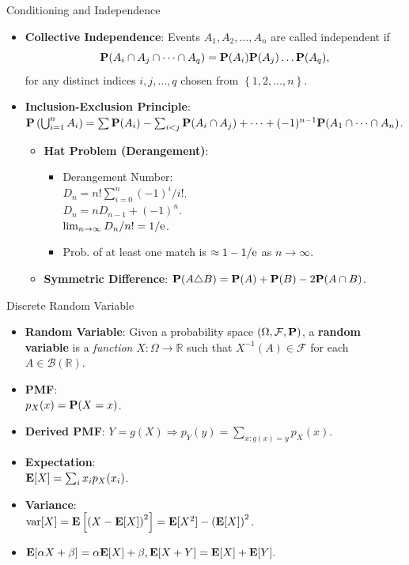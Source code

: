 \documentclass[landscape,a4paper]{article}
\begin{document}
\begin{cheatsheetcolumns}
\begin{card}{Conditioning and Independence}
\begin{itemize}
			\item \textbf{Collective Independence}: Events $A_1,A_2,\dots, A_n$ are called independent if
			\[
			\mathbf{P}(A_i\cap A_j\cap \dots\cap A_q)=\mathbf{P}(A_i)\mathbf{P}(A_j)\dots\mathbf{P}(A_q),
			\]
			for any distinct indices $i,j,\dots,q$ chosen from $\left\{1,2,\dots,n\right\}$.
			\item \textbf{Inclusion-Exclusion Principle}:
			$\mathbf{P}\left(\bigcup_{i=1}^n A_i\right) = \sum \mathbf{P}(A_i) - \sum_{i<j} \mathbf{P}(A_i \cap A_j) + \dots + (-1)^{n-1} \mathbf{P}(A_1 \cap \dots \cap A_n)$.
			\begin{itemize}
				\item \textbf{Hat Problem (Derangement)}: 
				\begin{itemize}
					\item Derangement Number:\\ $D_n=n!\sum_{i=0}^n(-1)^i/i!$.\\
					$D_n=nD_{n-1}+(-1)^n$.\\
					$\lim_{n\to\infty} D_n/n!=1/\mathrm{e}$.
					\item Prob. of at least one match is $\approx 1 - 1/\mathrm{e}$ as $n\to\infty$.
				\end{itemize}
				\item \textbf{Symmetric Difference}: $\mathbf{P}(A \triangle B) = \mathbf{P}(A) + \mathbf{P}(B) - 2\mathbf{P}(A \cap B)$.
			\end{itemize}
			\end{itemize}
		\end{card}
		\begin{card}{Discrete Random Variable}
			\begin{itemize}
				\item \textbf{Random Variable}: Given a probability space $(\Omega,\mathcal F,\mathbf{P})$, a \textbf{random variable} is a \textit{function} $X\colon \Omega\to \mathbb R$ such that $X^{-1}(A)\in\mathcal F$ for each $A\in\mathcal B(\mathbb R)$.
				\item \textbf{PMF}:\\ $p_X(x)=\mathbf{P}(X=x)$.
				\item \textbf{Derived PMF}: $Y=g(X)\Rightarrow p_Y(y)=\sum_{x:g(x)=y}p_X(x)$.
				\item \textbf{Expectation}:\\ $\mathbf{E}[X]=\sum_ix_ip_X(x_i)$.
				\item \textbf{Variance}:\\ $\operatorname{var}[X]=\mathbf{E}\left[\left(X-\mathbf{E}[X]\right)^2\right]=\mathbf{E}[X^2]-\left(\mathbf{E}[X]\right)^2$.
				\item $\mathbf{E}[\alpha X+ \beta]=\alpha\mathbf{E}[X]+\beta,\mathbf{E}[X+Y]=\mathbf{E}[X]+\mathbf{E}[Y].$

\end{itemize}
\end{card}
\end{cheatsheetcolumns}
\end{document}

